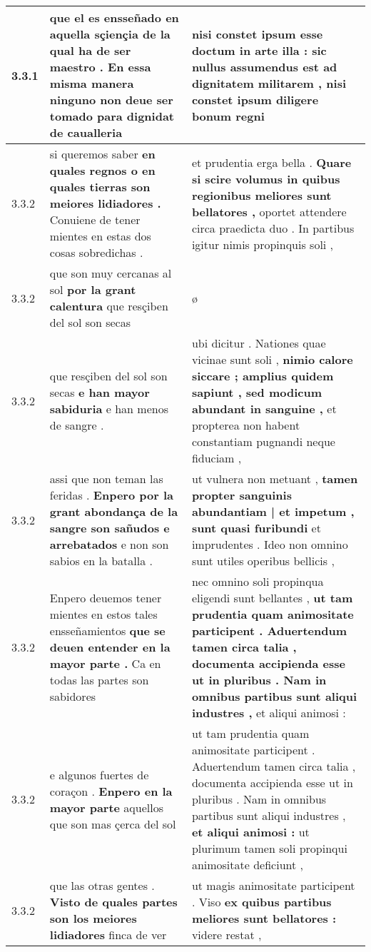 \begin{tabular}{|p{1cm}|p{6.5cm}|p{6.5cm}|}
3.3.1 & que el es ensseñado en aquella sçiençia de la qual ha de ser maestro . \textbf{ En essa misma manera ninguno non deue ser tomado } para dignidat de caualleria & nisi constet ipsum esse doctum in arte illa : \textbf{ sic nullus assumendus est ad dignitatem militarem , } nisi constet ipsum diligere bonum regni \\\hline
3.3.2 & si queremos saber \textbf{ en quales regnos o en quales tierras son meiores lidiadores . } Conuiene de tener mientes en estas dos cosas sobredichas . & et prudentia erga bella . \textbf{ Quare si scire volumus in quibus regionibus meliores sunt bellatores , } oportet attendere circa praedicta duo . In partibus igitur nimis propinquis soli , \\\hline
3.3.2 & que son muy cercanas al sol \textbf{ por la grant calentura } que resçiben del sol son secas & ø \\\hline
3.3.2 & que resçiben del sol son secas \textbf{ e han mayor sabiduria } e han menos de sangre . & ubi dicitur . Nationes quae vicinae sunt soli , \textbf{ nimio calore siccare ; amplius quidem sapiunt , sed modicum abundant in sanguine , } et propterea non habent constantiam pugnandi neque fiduciam , \\\hline
3.3.2 & assi que non teman las feridas . \textbf{ Enpero por la grant abondança de la sangre son sañudos e arrebatados } e non son sabios en la batalla . & ut vulnera non metuant , \textbf{ tamen propter sanguinis abundantiam | et impetum , sunt quasi furibundi } et imprudentes . Ideo non omnino sunt utiles operibus bellicis , \\\hline
3.3.2 & Enpero deuemos tener mientes en estos tales ensseñamientos \textbf{ que se deuen entender en la mayor parte . } Ca en todas las partes son sabidores & nec omnino soli propinqua eligendi sunt bellantes , \textbf{ ut tam prudentia quam animositate participent . Aduertendum tamen circa talia , documenta accipienda esse ut in pluribus . Nam in omnibus partibus sunt aliqui industres , } et aliqui animosi : \\\hline
3.3.2 & e algunos fuertes de coraçon . \textbf{ Enpero en la mayor parte } aquellos que son mas çerca del sol & ut tam prudentia quam animositate participent . Aduertendum tamen circa talia , documenta accipienda esse ut in pluribus . Nam in omnibus partibus sunt aliqui industres , \textbf{ et aliqui animosi : } ut plurimum tamen soli propinqui animositate deficiunt , \\\hline
3.3.2 & que las otras gentes . \textbf{ Visto de quales partes son los meiores lidiadores } finca de ver & ut magis animositate participent . Viso \textbf{ ex quibus partibus meliores sunt bellatores : } videre restat , \\\hline

\end{tabular}
